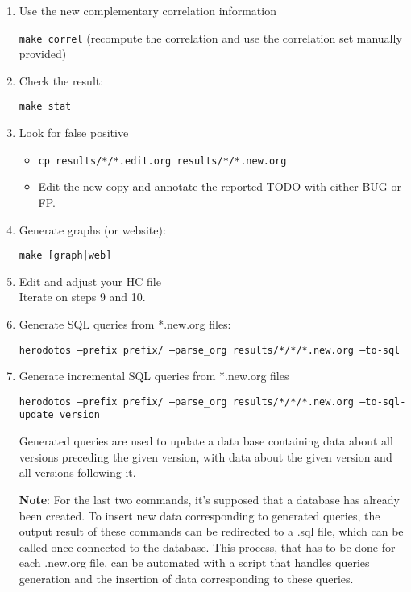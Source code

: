 \begin{enumerate}
\item Use the new complementary correlation information

  \texttt{make correl} (recompute the correlation and use the
  correlation set manually provided)

\item Check the result:

  \texttt{make stat}

\item Look for false positive

  \begin{itemize}
  \item \texttt{cp results/*/*.edit.org results/*/*.new.org}
  \item Edit the new copy and annotate the reported TODO with either
    BUG or FP.
  \end{itemize}

\item Generate graphs (or website):

  \texttt{make [graph|web]}

\item Edit and adjust your HC file\\

  Iterate on steps 9 and 10.

\item Generate SQL queries from *.new.org files:
  
  \texttt{herodotos ---prefix prefix/ ---parse\_org results/*/*/*.new.org ---to-sql}
  
\item Generate incremental SQL queries from *.new.org files

  \texttt{herodotos ---prefix prefix/ ---parse\_org results/*/*/*.new.org ---to-sql-update version}
  
  Generated queries are used to update a data base containing data
  about all versions preceding the given version, with data about the
  given version and all versions following it.
  
  \textbf{Note}: For the last two commands, it's supposed that a
  database has already been created. To insert new data corresponding
  to generated queries, the output result of these commands can be
  redirected to a .sql file, which can be called once connected to the
  database. This process, that has to be done for each .new.org file,
  can be automated with a script that handles queries generation and
  the insertion of data corresponding to these queries.
\end{enumerate}


